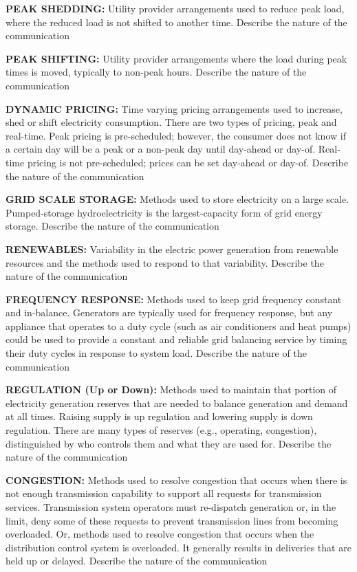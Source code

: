 \wl
\textbf{PEAK SHEDDING:}  Utility provider arrangements used to reduce peak load, where the 
reduced load is not shifted to another time. 
Describe the nature of the communication	

\wl
\noindent
\textbf{PEAK SHIFTING:}  Utility provider arrangements where the load during peak times is moved, typically 
to non-peak hours. 
Describe the nature of the communication	

\wl
\noindent
\textbf{DYNAMIC PRICING:}  Time varying pricing arrangements used to increase, shed or shift electricity 
consumption. There are two types of pricing, peak and real-time.  Peak pricing is pre-scheduled; 
however, the consumer does not know if a certain day will be a peak or a non-peak day until day-ahead 
or day-of.  Real-time pricing is not pre-scheduled; prices can be set day-ahead or day-of.	
Describe the nature of the communication	

\wl
\noindent
\textbf{GRID SCALE STORAGE:}  Methods used to store electricity on a large scale. Pumped-storage 
hydroelectricity is the largest-capacity form of grid energy storage. 
Describe the nature of the communication	

\wl
\noindent
\textbf{RENEWABLES:}  Variability in the electric power generation from renewable resources 
and the methods used to respond to that variability. 
Describe the nature of the communication	

\wl
\noindent
\textbf{FREQUENCY RESPONSE:}  Methods used to keep grid frequency constant and in-balance. 
Generators are typically used for frequency response, but any appliance that operates 
to a duty cycle (such as air conditioners and heat pumps) could be used to provide 
a constant and reliable grid balancing service by timing their duty cycles in response 
to system load.   	
Describe the nature of the communication	

\wl
\noindent
\textbf{REGULATION (Up or Down):} Methods used to maintain that portion of electricity generation 
reserves that are needed to balance generation and demand at all times.  Raising supply 
is up regulation and lowering supply is down regulation. There are many types of reserves 
(e.g., operating, congestion), distinguished by who controls them and what they are used for. 
Describe the nature of the communication	

\wl
\noindent
\textbf{CONGESTION:} Methods used to resolve congestion that occurs when there is not enough 
transmission capability to support all requests for transmission services. Transmission 
system operators must re-dispatch generation or, in the limit, deny some of these 
requests to prevent transmission lines from becoming overloaded.  Or, methods used to 
resolve congestion that occurs when the distribution control system is overloaded.  It 
generally results in deliveries that are held up or delayed.     
Describe the nature of the communication

